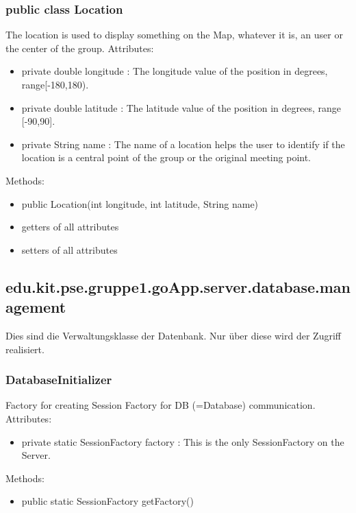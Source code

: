	\subsubsection{public class Location}
	The location is used to display something on the Map, whatever it is, an user or the center of the group.
	\newline Attributes:
	\begin{itemize}
	\item private  double longitude : The longitude value of the position in degrees, range[-180,180). 
	\item private  double latitude : The latitude value of the position in degrees, range [-90,90].
	\item private String name : The name of a location helps the user to identify if the location is a central point of the group or the original meeting point.
	\end{itemize}
	Methods:
	\begin{itemize}
	\item public Location(int longitude, int latitude, String name)
	\item getters of all attributes
	\item setters of all attributes
	\end{itemize}


\hypertarget{database.management}{}
	\subsection{edu.kit.pse.gruppe1.goApp.server.database.management}	
	Dies sind die Verwaltungsklasse der Datenbank. Nur über diese wird der Zugriff realisiert.

	\subsubsection{DatabaseInitializer}
	Factory for creating Session Factory for DB (=Database) communication.
	\newline 
	Attributes:
	\begin{itemize}
		\item private static SessionFactory factory : This is the only SessionFactory on the Server.
	\end{itemize}
	Methods:
	\begin{itemize}
		\item public static SessionFactory getFactory()
	\end{itemize}
	
